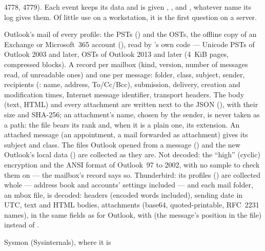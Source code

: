 \documentclass[11pt,a4paper,oneside]{report}
\begin{document}
\begin{description}[style=nextline,leftmargin=1.2em]
        4778, 4779). Each event keeps its data and is given ,
        ,  and , whatever
        name its log gives them. Of little use on a workstation, it is the
        first question on a server.
  \item[\fichier{emails.json}] Outlook's mail of every profile: the PSTs
        () and the OSTs, the
        offline copy of an Exchange or Microsoft~365 account
        (),
        read by \wac{}'s own code — Unicode PSTs of Outlook 2003 and later,
        OSTs of Outlook 2013 and later (4~KiB pages, compressed blocks). A
        record per mailbox (kind, version, number of messages read, of
        unreadable ones) and one per message: folder, class, subject, sender,
        recipients (: name, address, To/Cc/Bcc), submission,
        delivery, creation and modification times, Internet message
        identifier, transport headers. The body (text, HTML) and every
        attachment are written next to the JSON
        (),
        with their size and SHA-256; an attachment's name, chosen by the
        sender, is never taken as a path: the file bears its rank and, when it
        is a plain one, its extension. An attached message (an appointment, a
        mail forwarded as attachment) gives its subject and class. The files
        Outlook opened from a message () and the new Outlook's local data
        ()
        are collected as they are. Not decoded: the ``high'' (cyclic)
        encryption and the ANSI format of Outlook~97 to 2002, with no sample to
        check them on — the mailbox's record says so. Thunderbird: its profiles
        ()
        are collected whole — address book and accounts' settings included —
        and each mail folder, an mbox file, is decoded: headers (encoded words
        included), sending date in UTC, text and HTML bodies, attachments
        (base64, quoted-printable, RFC~2231 names), in the same fields as for
        Outlook, with  (the message's position in the file)
        instead of .
  \item[\fichier{sysmon.json}] Sysmon (Sysinternals), where it is

\end{description}
\end{document}
